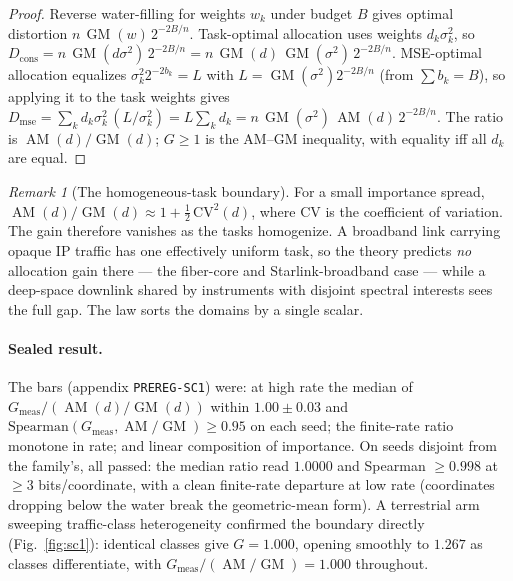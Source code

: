 \documentclass[11pt]{article}
\theoremstyle{definition}
\theoremstyle{remark}
\newtheorem*{remark}{Remark}
\newcommand{\AM}{\operatorname{AM}}
\newcommand{\GM}{\operatorname{GM}}
\begin{document}
\begin{proof}
Reverse water-filling for weights $w_k$ under budget $B$ gives optimal
distortion $n\,\GM(w)\,2^{-2B/n}$. Task-optimal allocation uses
weights $d_k\sigma_k^2$, so
$D_{\mathrm{cons}}=n\,\GM(d\sigma^2)\,2^{-2B/n}
   =n\,\GM(d)\,\GM(\sigma^2)\,2^{-2B/n}$.
MSE-optimal allocation equalizes $\sigma_k^2 2^{-2b_k}=L$ with
$L=\GM(\sigma^2)2^{-2B/n}$ (from $\sum b_k=B$), so applying it to the
task weights gives
$D_{\mathrm{mse}}=\sum_k d_k\sigma_k^2\,(L/\sigma_k^2)
   =L\sum_k d_k=n\,\GM(\sigma^2)\,\AM(d)\,2^{-2B/n}$.
The ratio is $\AM(d)/\GM(d)$; $G\ge1$ is the AM--GM inequality, with
equality iff all $d_k$ are equal.
\end{proof}

\begin{remark}[The homogeneous-task boundary]
For a small importance spread, $\AM(d)/\GM(d)\approx 1+\tfrac12\,
\mathrm{CV}^2(d)$, where $\mathrm{CV}$ is the coefficient of variation.
The gain therefore vanishes as the tasks homogenize. A broadband
link carrying opaque IP traffic has one effectively uniform task, so
the theory predicts \emph{no} allocation gain there --- the fiber-core
and Starlink-broadband case --- while a deep-space downlink shared by
instruments with disjoint spectral interests sees the full gap. The law
sorts the domains by a single scalar.
\end{remark}

\paragraph{Sealed result.}
The bars (appendix \texttt{PREREG-SC1}) were: at high rate the median of
$G_{\mathrm{meas}}/(\AM(d)/\GM(d))$ within $1.00\pm0.03$ and
$\mathrm{Spearman}(G_{\mathrm{meas}},\AM/\GM)\ge0.95$ on each seed; the
finite-rate ratio monotone in rate; and linear composition of importance.
On seeds disjoint from the family's, all passed: the median ratio read
$1.0000$ and Spearman $\ge0.998$ at $\ge3$ bits/coordinate, with a clean
finite-rate departure at low rate (coordinates dropping below the water
break the geometric-mean form). A terrestrial arm sweeping traffic-class
heterogeneity confirmed the boundary directly (Fig.~\ref{fig:sc1}): identical classes
give $G=1.000$, opening smoothly to $1.267$ as classes differentiate,
with $G_{\mathrm{meas}}/(\AM/\GM)=1.000$ throughout.
\end{document}
